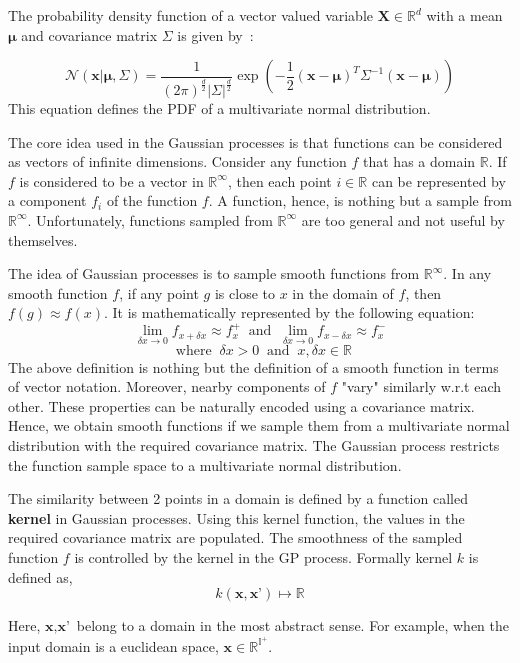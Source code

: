 \documentclass[11pt]{report}
\begin{document}
The probability density function of a vector valued variable $\textbf{X} \in \mathbb{R}^d$ with a mean $\boldsymbol{\mu}$ and covariance matrix $\Sigma$ is given by~\cite{MITMLBook}:

$$
\mathcal{N}(\textbf{x} | \boldsymbol{\mu},  \Sigma) = 
\frac{1}{(2\pi)^{\frac{d}{2}} |\Sigma|^{\frac{d}{2}}}
\exp\left( - \frac{1}{2} (\textbf{x} - \boldsymbol{\mu})^T  \Sigma^{-1}   (\textbf{x} - \boldsymbol{\mu}) \right)
$$
This equation defines the PDF of a multivariate normal distribution.

The core idea used in the Gaussian processes is that functions can be considered as vectors of infinite dimensions.
Consider any function $f$ that has a domain $\mathbb{R}$.
If $f$ is considered to be a vector in $\mathbb{R}^{\infty}$,
then each point $i \in \mathbb{R}$  can be represented by a component $f_i$ of the function $f$.
A function,  hence,  is nothing but a sample from $\mathbb{R}^{\infty}$.
Unfortunately, functions sampled from $\mathbb{R}^{\infty}$ are too general and not useful by themselves.

The idea of Gaussian processes is to sample smooth functions from $\mathbb{R}^{\infty}$.
In any smooth function $f$, if any point $g$ is close to $x$ in the domain of $f$, then $f(g) \approx f(x)$.
It is mathematically represented by the following equation:
$$
\lim_{\delta x \to 0} f_{x + \delta x} \approx f^{+}_x  \;\; \textrm{and} \;\; 
\lim_{\delta x \to 0} f_{x - \delta x} \approx f^{-}_x 
$$
$$\;\; \textrm{where} \;\; \delta x > 0 \;\; \textrm{and} \;\; x, \delta x \in \mathbb{R}
$$
The above definition is nothing but the definition of a smooth function in terms of vector notation. 
Moreover, nearby components of $f$ "vary" similarly w.r.t each other.
These properties can be naturally encoded using a covariance matrix.
Hence, we obtain smooth functions if we sample them from a multivariate normal distribution with the required covariance matrix.
The Gaussian process restricts the function sample space to a multivariate normal distribution.

The similarity between 2 points in a domain is defined by a function called \textbf{kernel} in Gaussian processes.
Using this kernel function, the values in the required covariance matrix are populated.
The smoothness of the sampled function $f$ is controlled by the kernel in the GP process.
Formally kernel $k$ is defined as,
$$
k(\textbf{x}, \textbf{x'}) \mapsto \mathbb{R}
$$

Here, $\textbf{x}, \textbf{x'}$ belong to a domain in the most abstract sense.
For example,  when the input domain is a euclidean space,  $\textbf{x} \in \mathbb{R}^{\mathbb{I}^+}$.
\end{document}
